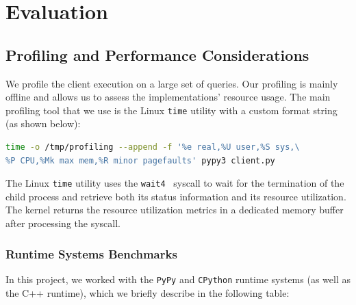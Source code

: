 
\section{Evaluation}
\label{sec:Eval}
\subsection{Profiling and Performance Considerations}
We profile the client execution on a large set of queries. Our profiling is mainly offline and allows us to assess the implementations' resource usage. The main profiling tool that we use is the Linux \texttt{time} utility with a custom format string (as shown below):

\begin{lstlisting}[language=bash]
time -o /tmp/profiling --append -f '%e real,%U user,%S sys,\
%P CPU,%Mk max mem,%R minor pagefaults' pypy3 client.py
\end{lstlisting}

The Linux \texttt{time} utility uses the \texttt{wait4}~\cite{wait4} syscall to wait for the termination of the child process and retrieve both its status information and its resource utilization. The kernel returns the resource utilization metrics in a dedicated memory buffer after processing the syscall.

\subsubsection{Runtime Systems Benchmarks}
In this project, we worked with the \texttt{PyPy} and \texttt{CPython} runtime systems (as well as the C++ runtime), which we briefly describe in the following table:\\

\begin{table}[h!]
\centering
\caption{Comparison between PyPy and CPython}
\label{pypy_cpython_comparison}
\end{table}

